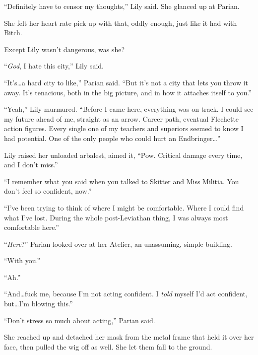 ``Definitely have to censor my thoughts,'' Lily said.  She glanced up at Parian.



She felt her heart rate pick up with that, oddly enough, just like it had with Bitch.



Except Lily wasn't dangerous, was she?



``\emph{God}, I hate this city,'' Lily  said.



``It's\ldots a hard city to like,'' Parian said.  ``But it's not a city that lets you throw it away.  It's tenacious, both in the big picture, and in how it attaches itself to you.''



``Yeah,'' Lily murmured.  ``Before I came here, everything was on track.  I could see my future ahead of me, straight as an arrow.  Career path, eventual Flechette action figures.  Every single one of my teachers and superiors seemed to know I had potential.  One of the only people who could hurt an Endbringer\ldots''



Lily raised her unloaded arbalest, aimed it, ``Pow.  Critical damage every time, and I don't miss.''



``I remember what you said when you talked to Skitter and Miss Militia.  You don't feel so confident, now.''



``I've been trying to think of where I might be comfortable.  Where I could find what I've lost.  During the whole post-Leviathan thing, I was always most comfortable here.''



``\emph{Here}?'' Parian looked over at her Atelier, an unassuming, simple building.



``With you.''



``Ah.''



``And\ldots fuck me, because I'm not acting confident.  I \emph{told} myself I'd act confident, but\ldots I'm blowing this.''



``Don't stress so much about acting,'' Parian said.



She reached up and detached her mask from the metal frame that held it over her face, then pulled the wig off as well.  She let them fall to the ground.



